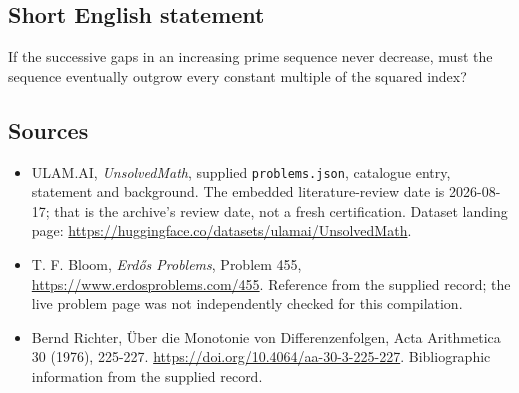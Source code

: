 \documentclass[11pt,a4paper]{article}
\begin{document}
\subsection{Short English statement}

If the successive gaps in an increasing prime sequence never decrease, must the sequence eventually outgrow every constant multiple of the squared index?

\subsection{Sources}

{\small

\begin{itemize}

\item[\hypertarget{source:statement:1}{S1}] ULAM.AI, \emph{UnsolvedMath}, supplied \texttt{problems.json}, catalogue entry, statement and background. The embedded literature-review date is 2026-08-17; that is the archive’s review date, not a fresh certification. Dataset landing page: \url{https://huggingface.co/datasets/ulamai/UnsolvedMath}.

\item[\hypertarget{source:statement:2}{S2}] T. F. Bloom, \emph{Erdős Problems}, Problem 455, \url{https://www.erdosproblems.com/455}. Reference from the supplied record; the live problem page was not independently checked for this compilation.

\item[\hypertarget{source:statement:3}{S3}] Bernd Richter, Über die Monotonie von Differenzenfolgen, Acta Arithmetica 30 (1976), 225-227. \url{https://doi.org/10.4064/aa-30-3-225-227}. Bibliographic information from the supplied record.

\end{itemize}

}

\label{end:statement}
\end{document}
